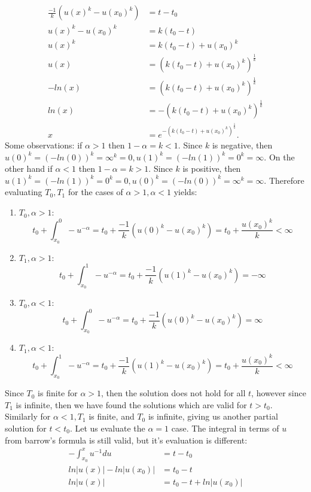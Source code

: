 \documentclass[12pt, letterpaper]{article}
\begin{document}
\begin{enumerate}
\begin{enumerate}
			\begin{align*}
				\frac{-1}{k}(u(x)^{k}-u(x_0)^{k}) &= t - t_0\\
				u(x)^{k}-u(x_0)^{k} &= k(t_0-t)\\
				u(x)^k &= k(t_0-t) + u(x_0)^{k}\\
				u(x) &= (k(t_0-t) + u(x_0)^{k})^\frac{1}{k}\\
				-ln(x) &= (k(t_0-t) + u(x_0)^{k})^\frac{1}{k}\\
				ln(x) &= -(k(t_0-t) + u(x_0)^{k})^\frac{1}{k}\\
				x &= e^{-(k(t_0-t) + u(x_0)^{k})^\frac{1}{k}}.
			\end{align*}
			Some observations:  if $\alpha > 1$ then $1-\alpha = k < 1$.  Since $k$ is negative, then $u(0)^k = (-ln(0))^k = \infty^k = 0, u(1)^k = (-ln(1))^k = 0^k = \infty$.  On the other hand if $\alpha < 1$ then $1-\alpha = k > 1$.  Since $k$ is positive, then $u(1)^k = (-ln(1))^k = 0^k = 0, u(0)^k = (-ln(0))^k = \infty^k = \infty$.  Therefore evaluating $T_0, T_1$ for the cases of $\alpha >1, \alpha < 1$ yields:
			\begin{enumerate}
				\item $T_0, \alpha > 1$: $$t_0 + \int_{x_0}^0 -u^{-\alpha} = t_0 + \frac{-1}{k}(u(0)^{k}-u(x_0)^{k}) = t_0 + \frac{u(x_0)^{k}}{k} < \infty$$
				\item $T_1, \alpha > 1$: $$t_0 + \int_{x_0}^1 -u^{-\alpha} = t_0 + \frac{-1}{k}(u(1)^{k}-u(x_0)^{k}) =  -\infty$$
				\item $T_0, \alpha < 1$: $$t_0 + \int_{x_0}^0 -u^{-\alpha} = t_0 + \frac{-1}{k}(u(0)^{k}-u(x_0)^{k}) =  \infty$$
				\item $T_1, \alpha < 1$: $$t_0 + \int_{x_0}^1 -u^{-\alpha} = t_0 + \frac{-1}{k}(u(1)^{k}-u(x_0)^{k}) = t_0 + \frac{u(x_0)^{k}}{k} < \infty$$
\end{enumerate}			 
			Since $T_0$ is finite for $\alpha > 1$, then the solution does not hold for all $t$, however since $T_1$ is infinite, then we have found the solutions which are valid for $t>t_0$.  Similarly for $\alpha < 1, T_1$ is finite, and $T_0$ is infinite, giving us another partial solution for $t < t_0$. Let us evaluate the $\alpha = 1$ case.  The integral in terms of $u$ from barrow's formula is still valid, but it's evaluation is different:
			\begin{align*}
				-\int_{x_0}^x u^{-1}du &= t-t_0\\
				ln|u(x)| - ln|u(x_0)| &= t_0-t\\
				ln|u(x)| & = t_0 -t + ln|u(x_0)|\\

\end{align*}
\end{enumerate}
\end{enumerate}
\end{document}
